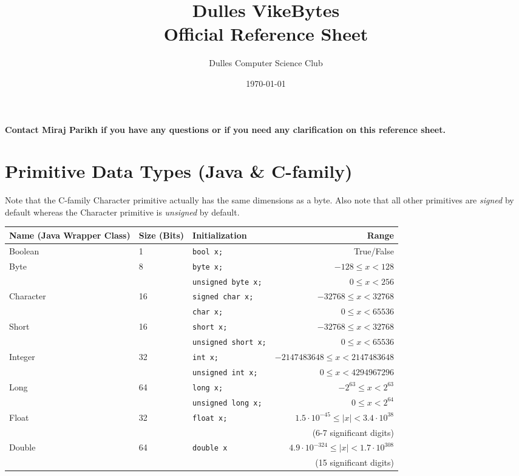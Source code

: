 \documentclass{article}
\title{Dulles VikeBytes\\Official Reference Sheet}
\date{\today}
\author{Dulles Computer Science Club}
\begin{document}

{\let\newpage\relax\maketitle} %
\textbf{Contact Miraj Parikh if you have any questions or if you need any clarification on this reference sheet.}

\renewcommand{\arraystretch}{1.25} %
\section{Primitive Data Types (Java \& C-family)}
Note that the C-family Character primitive actually has the same dimensions as a byte. Also note that all other primitives are \textit{signed} by default whereas the Character primitive is \textit{unsigned} by default.
\begin{center}\begin{tabular}{lllr}\toprule
  Name (Java Wrapper Class)      &Size (Bits) &Initialization              &Range \\\midrule
  Boolean   &1           &\lstinline|bool x;|           &True/False \\\midrule
  Byte      &8           &\lstinline|byte x;|           &\(-128 \leq x < 128\) \\
            &            &\lstinline|unsigned byte x;|  &\(0 \leq x < 256\) \\
  Character &16          &\lstinline|signed char x;|    &\(-32768 \leq x < 32768\) \\ 
            &            &\lstinline|char x;|           &\(0 \leq x < 65536\) \\
  Short     &16          &\lstinline|short x;|          &\(-32768 \leq x < 32768\) \\
            &            &\lstinline|unsigned short x;| &\(0 \leq x < 65536\) \\
  Integer   &32          &\lstinline|int x;|            &\(-2147483648 \leq x < 2147483648\) \\
            &            &\lstinline|unsigned int x;|   &\(0 \leq x < 4294967296\) \\
  Long      &64          &\lstinline|long x;|           &\(-2^{63} \leq x < 2^{63}\) \\
            &            &\lstinline|unsigned long x;|  &\(0 \leq x < 2^{64}\) \\\midrule
  Float     &32          &\lstinline|float x;|          &\(1.5\cdot10^{-45} \leq |x| < 3.4\cdot10^{38}\) \\
            &            &                              &(6-7 significant digits) \\
  Double    &64          &\lstinline|double x|          &\(4.9\cdot10^{-324} \leq |x| < 1.7\cdot10^{308}\) \\
            &            &                              &(15 significant digits) \\
\bottomrule\end{tabular}\end{center}
\end{document}
